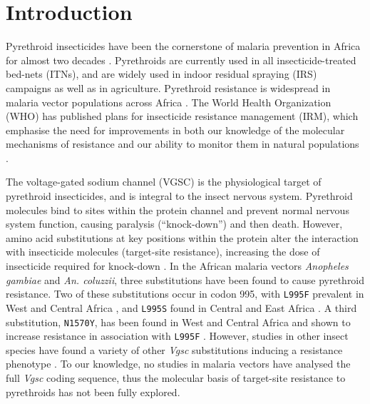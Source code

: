 \documentclass[a4paper,11pt,abstracton,hidelinks]{scrartcl}
\begin{document}
\begin{abstract}
\end{abstract}


\section*{Introduction}


Pyrethroid insecticides have been the cornerstone of malaria prevention in Africa for almost two decades \cite{Bhatt2015}.
%
Pyrethroids are currently used in all insecticide-treated bed-nets (ITNs), and are widely used in indoor residual spraying (IRS) campaigns as well as in agriculture.
%
Pyrethroid resistance is widespread in malaria vector populations across Africa \cite{Hemingway2016}.
%
The World Health Organization (WHO) has published plans for insecticide resistance management (IRM), which emphasise the need for improvements in both our knowledge of the molecular mechanisms of resistance and our ability to monitor them in natural populations \cite{WorldHealthOrganization2012}.


The voltage-gated sodium channel (VGSC) is the physiological target of pyrethroid insecticides, and is integral to the insect nervous system.
%
Pyrethroid molecules bind to sites within the protein channel and prevent normal nervous system function, causing paralysis (``knock-down'') and then death.
%
However, amino acid substitutions at key positions within the protein alter the interaction with insecticide molecules (target-site resistance), increasing the dose of insecticide required for knock-down \cite{Davies2007a,Dong2014}.
%
In the African malaria vectors \textit{Anopheles gambiae} and \textit{An. coluzzii}, three substitutions have been found to cause pyrethroid resistance.
%
Two of these substitutions occur in codon 995\footnotemark, with \texttt{L995F} prevalent in West and Central Africa \cite{Martinez-Torres1998,Silva2014}, and \texttt{L995S} found in Central and East Africa \cite{Ranson2000,Silva2014}.
%
A third substitution, \texttt{N1570Y}, has been found in West and Central Africa and shown to increase resistance in association with \texttt{L995F} \cite{Jones2012}.
%
However, studies in other insect species have found a variety of other \emph{Vgsc} substitutions inducing a resistance phenotype \cite{Davies2007b,Rinkevich2013,Dong2014}.
%
To our knowledge, no studies in malaria vectors have analysed the full \emph{Vgsc} coding sequence, thus the molecular basis of target-site resistance to pyrethroids has not been fully explored.
\end{document}
